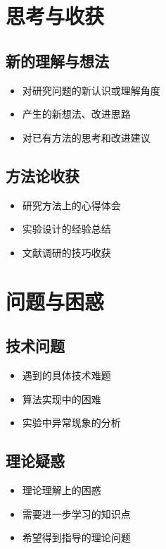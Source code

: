 \documentclass[12pt,a4paper]{article}
\begin{document}
\section{思考与收获}

\subsection{新的理解与想法}
\begin{itemize}
    \item 对研究问题的新认识或理解角度
    \item 产生的新想法、改进思路
    \item 对已有方法的思考和改进建议
\end{itemize}

\subsection{方法论收获}
\begin{itemize}
    \item 研究方法上的心得体会
    \item 实验设计的经验总结
    \item 文献调研的技巧收获
\end{itemize}

\section{问题与困惑}

\subsection{技术问题}
\begin{itemize}
    \item 遇到的具体技术难题
    \item 算法实现中的困难
    \item 实验中异常现象的分析
\end{itemize}

\subsection{理论疑惑}
\begin{itemize}
    \item 理论理解上的困惑
    \item 需要进一步学习的知识点
    \item 希望得到指导的理论问题
\end{itemize}
\end{document}
